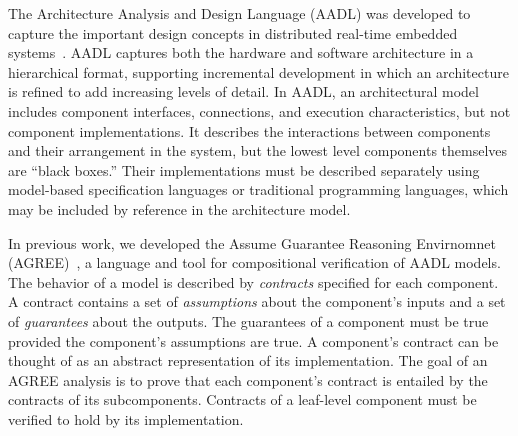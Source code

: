 The Architecture Analysis and Design Language (AADL) was developed to capture the important 
design concepts in distributed real-time embedded systems~\cite{FeilerModelBasedEngineering2012}. 
AADL captures both the hardware and software architecture in a hierarchical format,  
supporting incremental development in which an architecture is refined to add increasing levels of detail.
%
In AADL, an architectural model includes component interfaces, connections, and execution characteristics, but not component implementations. It describes the interactions between components and their arrangement in the system, but the lowest level 
components themselves are ``black boxes.'' Their implementations must be described separately using model-based specification languages or traditional programming languages, which may be included by reference in the architecture model.  

In previous work, we developed the Assume Guarantee Reasoning Envirnomnet (AGREE)~\cite{8625938}, a language and tool for compositional verification of AADL models.  The behavior of a model is described by {\em contracts} specified for each component.  A contract contains a set of {\em assumptions} about the component's inputs and a set of {\em guarantees} about the outputs.  The guarantees of a component must be true provided the component's assumptions are true.  A component's contract can be
thought of as an abstract representation of its implementation.  The goal of an AGREE analysis is to prove that each component's contract is entailed by the contracts of its subcomponents.  Contracts of a leaf-level component must be verified to hold by its implementation.  

